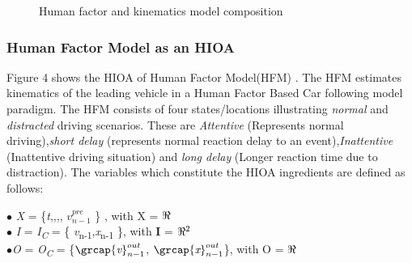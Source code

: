 {\begin{figure}
\begin{tikzpicture}
	
	\end{tikzpicture}
	\caption{Human factor and kinematics model composition} \label{fig1}
\end{figure}
\subsubsection{Human Factor Model as an HIOA}
 Figure 4 shows the HIOA of Human Factor Model(HFM) \citep{Ro2018}. The HFM estimates kinematics of the leading vehicle in a Human Factor Based Car following model paradigm. The HFM consists of four states/locations  illustrating  \textit{normal} and \textit{distracted} driving scenarios. These are \textit{Attentive} (Represents normal driving),\textit{short delay} (represents normal reaction delay to an event),\textit{Inattentive} (Inattentive driving situation) and \textit{long delay} (Longer reaction time due to distraction).
 The variables which constitute the HIOA ingredients are defined as follows:

\hspace*{1cm} $\bullet$ \textit{X} = \{\textit{t},,,, $\textit{v}_{n-1}^{pre}$ \} , with X = $\real$ \\
\hspace*{1.4cm} $\bullet$ \textit{I} = \textit{I\textsubscript{C}} = \{ \textit{v}\textsubscript{n-1},\textit{x}\textsubscript{n-1} \}, with  $\boldsymbol{I}$ = $\real^{2}$ \\
 \hspace*{1.4cm} $\bullet$\textit{O} = \textit{O\textsubscript{C}} = \{$\grcap{\textit{v}}_{n-1}^{out }$, $\grcap{\textit{x}}_{n-1}^{out }$\}, with O = $\real$ 


}
